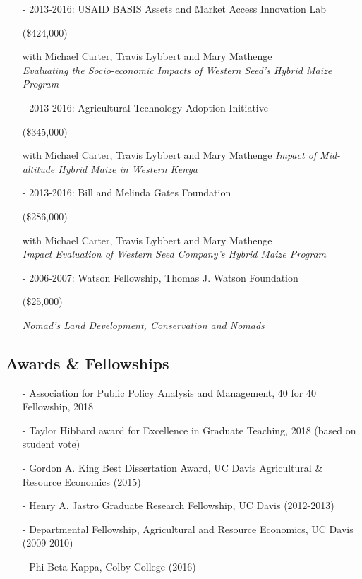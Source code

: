 \documentclass[11pt]{article}
\begin{document}
\begin{itemize}[itemsep=0pt, leftmargin=20pt]
\item [-]2013-2016: USAID BASIS Assets and Market Access Innovation Lab
\begin{money}
(\$424,000)
\end{money}
with Michael Carter, Travis Lybbert and Mary Mathenge \\
\emph{Evaluating the Socio-economic Impacts of Western Seed's Hybrid Maize Program}

\item [-]2013-2016: Agricultural Technology Adoption Initiative
\begin{money}
(\$345,000)
\end{money}
with Michael Carter, Travis Lybbert and Mary Mathenge
\emph{Impact of Mid-altitude Hybrid Maize in Western Kenya} 

\item [-]2013-2016: Bill and Melinda Gates Foundation
\begin{money}
(\$286,000)
\end{money}
with Michael Carter, Travis Lybbert and Mary Mathenge \\
\emph{Impact Evaluation of Western Seed Company's Hybrid Maize Program}

\item [-]2006-2007: Watson Fellowship, Thomas J. Watson Foundation
\begin{money}
(\$25,000)
\end{money}
\emph{Nomad's Land \textendash{} Development, Conservation and Nomads}
\end{itemize}

\subsection*{\sc Awards \& Fellowships}

\begin{itemize}[itemsep=-.1cm, leftmargin=20pt]
\item [-]Association for Public Policy Analysis and Management, 40 for 40 Fellowship, 2018
\item [-]Taylor Hibbard award for Excellence in Graduate Teaching, 2018 (based on student vote)
\item [-]Gordon A. King Best Dissertation Award, UC Davis Agricultural \& Resource Economics (2015)
\item [-]Henry A. Jastro Graduate Research Fellowship, UC Davis (2012-2013)
\item [-]Departmental Fellowship, Agricultural and Resource Economics, UC Davis (2009-2010)
\item [-]Phi Beta Kappa, Colby College (2016)
\end{itemize}
\end{document}
